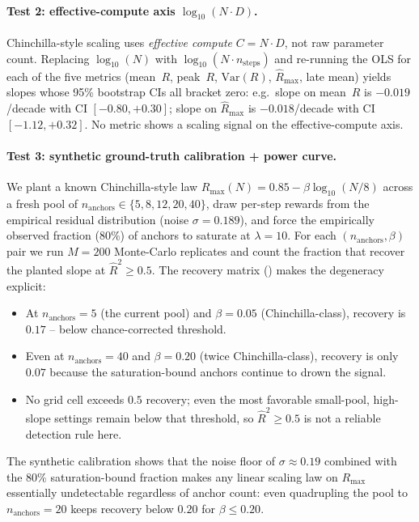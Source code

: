 \paragraph{Test 2: effective-compute axis $\log_{10}(N \cdot D)$.}
\label{par:scaling-iter121-effcomp}
Chinchilla-style scaling uses \emph{effective compute}
$C = N \cdot D$, not raw parameter count.  Replacing $\log_{10}(N)$
with $\log_{10}(N \cdot n_{\text{steps}})$ and re-running the OLS
for each of the five metrics (mean~$R$, peak~$R$, $\mathrm{Var}(R)$,
$\hat R_{\max}$, late mean) yields slopes whose 95\% bootstrap CIs
all bracket zero: e.g.\ slope on mean~$R$ is $-0.019$/decade with
CI $[-0.80, +0.30]$; slope on $\hat R_{\max}$ is $-0.018$/decade
with CI $[-1.12, +0.32]$.  No metric shows a scaling signal on the
effective-compute axis.

\paragraph{Test 3: synthetic ground-truth calibration + power curve.}
\label{par:scaling-iter121-power}
We plant a known Chinchilla-style law
$R_{\max}(N) = 0.85 - \beta \log_{10}(N/8)$
across a fresh pool of $n_{\text{anchors}} \in \{5,8,12,20,40\}$,
draw per-step rewards from the empirical residual distribution
(noise $\sigma = 0.189$), and force the empirically observed
fraction ($80\%$) of anchors to saturate at $\lambda = 10$.  For each
$(n_{\text{anchors}}, \beta)$ pair we run $M = 200$ Monte-Carlo
replicates and count the fraction that recover the planted slope
at $\hat R^2 \ge 0.5$.  The recovery matrix
() makes the degeneracy
explicit:
\begin{itemize}
  \item At $n_{\text{anchors}} = 5$ (the current pool) and
    $\beta = 0.05$ (Chinchilla-class), recovery is $0.17$ -- below
    chance-corrected threshold.
  \item Even at $n_{\text{anchors}} = 40$ and $\beta = 0.20$ (twice
    Chinchilla-class), recovery is only $0.07$ because the
    saturation-bound anchors continue to drown the signal.
  \item No grid cell exceeds $0.5$ recovery; even the most favorable
    small-pool, high-slope settings remain below that threshold, so
    $\hat R^2 \ge 0.5$ is not a reliable detection rule here.
\end{itemize}
The synthetic calibration shows that the noise floor of
$\sigma \approx 0.19$ combined with the $80\%$ saturation-bound
fraction makes any linear scaling law on $R_{\max}$ essentially
undetectable regardless of anchor count: even quadrupling the pool
to $n_{\text{anchors}} = 20$ keeps recovery below $0.20$ for
$\beta \le 0.20$.

